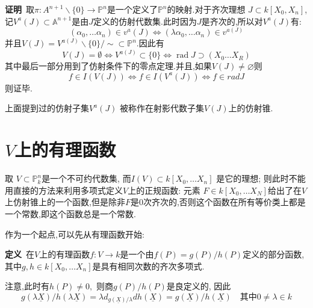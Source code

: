 \documentclass[UTF8]{book}
\begin{document}
		
		\textbf{证明}\ 取$\pi: A ^{n+1} \backslash\{0\} \rightarrow \mathbb{P}^{n}$是一个定义了$\mathbb{P} ^{n}$的映射.对于齐次理想 $J \subset k \left[ X _{0}, X _{ n }\right]$,记$V ^{ a }( J ) \subset \mathbb{A} ^{ n +1}$是由$ J $定义的仿射代数集.此时因为$ J $是齐次的,所以对$V ^{ a }( J )$有:
		\begin{equation*}
		\left(\alpha_{0}, \dots \alpha_{n}\right) \in v ^{ a }( J ) \Longleftrightarrow\left(\lambda \alpha_{0}, \dots \alpha_{n}\right) \in v ^{ a ( J )}
		\end{equation*}
		并且$V ( J )= V ^{ a ( J )} \backslash\{0\} / \sim \subset \mathbb{P} ^{ n } .$因此有
		\begin{equation*}
		V ( J )=\emptyset \Longleftrightarrow V ^{ a ( J )} \subset\{0\} \Longleftrightarrow \operatorname{rad} J \supset\left( X _{0} \ldots X _{ R }\right)
		\end{equation*}
		其中最后一部分用到了仿射条件下的零点定理.并且,如果$V ( J ) \neq \varnothing$则
		\begin{equation*}
		f \in I ( V ( J )) \Longleftrightarrow f \in I \left( V ^{ a }( J )\right) \Longleftrightarrow f \in rad J 
		\end{equation*}
		则证毕.
		
		
		上面提到过的仿射子集$V ^{ a }( J )$ 被称作在射影代数子集$ V(J) $上的仿射锥.
		
	\section{$ V $上的有理函数}
		取 $V \subset \mathbb{P} ^{ n }_{k}$是一个不可约代数集, 而$I ( V ) \subset k \left[ X _{0}, \ldots X _{ n }\right]$ 是它的理想; 则此时不能用直接的方法来利用多项式定义$ V $上的正规函数: 元素 $F \in k \left[ X _{0}, \ldots X _{ N }\right]$给出了在$ V $上仿射锥上的一个函数,但是除非$ F $是0次齐次的,否则这个函数在所有等价类上都是一个常数,即这个函数总是一个常数.
		
		
		作为一个起点,可以先从有理函数开始:
		
		
		\textbf{定义}\ 在$V$上的有理函数$f : V \rightarrow k$是一个由$f ( P )= g ( P ) / h ( P )$定义的部分函数,其中$ g , h \in k \left[ X _{0}, \ldots X _{ n }\right]$是具有相同次数的齐次多项式.
		
		注意,此时有$h ( P ) \neq 0,$ 则商$g ( P ) / h ( P )$是良定义的, 因此
		\begin{equation*}
		g (\lambda \underline{ X }) / h (\lambda \underline{ X })=\lambda d _{ g (\underline{ X }) / \lambda} d h (\underline{ X })= g (\underline{ X }) / h (\underline{ X }) \quad \text {其中} 0 \neq \lambda \in k
		\end{equation*}
		
\end{document}
